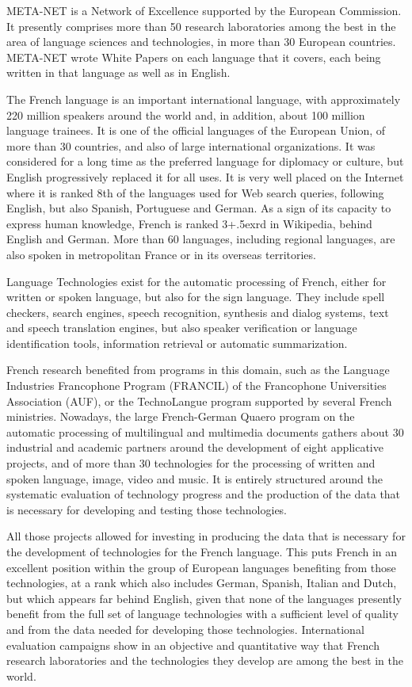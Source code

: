 \begin{multicols}{2}
META-NET is a Network of Excellence supported by the European Commission. It presently comprises more than 50 research laboratories among the best in the area of language sciences and technologies, in more than 30 European countries. META-NET wrote White Papers on each language that it covers, each being written in that language as well as in English.

The French language is an important international language, with approximately 220 million speakers around the world and, in addition, about 100 million language trainees. It is one of the official languages of the European Union, of more than 30 countries, and also of large international organizations. It was considered for a long time as the preferred language for diplomacy or culture, but English progressively replaced it for all uses. It is very well placed on the Internet where it is ranked 8th of the languages used for Web search queries, following English, but also Spanish, Portuguese and German. As a sign of its capacity to express human knowledge, French is ranked 3\raise+.5ex\hbox{rd} in Wikipedia, behind English and German. More than 60 languages, including regional languages, are also spoken in metropolitan France or in its overseas territories.

Language Technologies exist for the automatic processing of French, either for written or spoken language, but also for the sign language. They include spell checkers, search engines, speech recognition, synthesis and dialog systems, text and speech translation engines, but also speaker verification or language identification tools, information retrieval or automatic summarization.

French research benefited from programs in this domain, such as the Language Industries Francophone Program (FRANCIL) of the Francophone Universities Association (AUF), or the TechnoLangue program supported by several French ministries. Nowadays, the large French-German Quaero program on the automatic processing of multilingual and multimedia documents gathers about 30 industrial and academic partners around the development of eight applicative projects, and of more than 30 technologies for the processing of written and spoken language, image, video and music. It is entirely structured around the systematic evaluation of technology progress and the production of the data that is necessary for developing and testing those technologies.

All those projects allowed for investing in producing the data that is necessary for the development of technologies for the French language. This puts French in an excellent position within the group of European languages benefiting from those technologies, at a rank which also includes German, Spanish, Italian and Dutch, but which appears far behind English, given that none of the languages presently benefit from the full set of language technologies with a sufficient level of quality and from the data needed for developing those technologies. International evaluation campaigns show in an objective and quantitative way that French research laboratories and the technologies they develop are among the best in the world.


\end{multicols}

